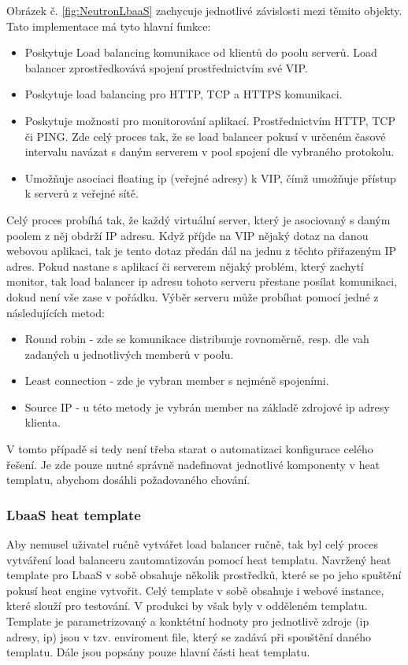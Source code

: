 Obrázek č. \ref{fig:NeutronLbaaS} zachycuje jednotlivé závislosti mezi těmito objekty. Tato implementace má tyto hlavní funkce:

\begin{itemize}
\item Poskytuje Load balancing komunikace od klientů do poolu serverů. Load balancer zprostředkovává spojení prostřednictvím své VIP.
\item Poskytuje load balancing pro HTTP, TCP a HTTPS komunikaci.
\item Poskytuje možnosti pro monitorování aplikací. Prostřednictvím HTTP, TCP či PING. Zde celý proces tak, že se load balancer pokusí v určeném časové intervalu navázat s daným serverem v pool spojení dle vybraného protokolu.
\item Umožňuje asociaci floating ip (veřejné adresy) k VIP, čímž umožňuje přístup k serverů z veřejné sítě.
\end{itemize}

Celý proces probíhá tak, že každý virtuální server, který je asociovaný s daným poolem z něj obdrží IP adresu. Když příjde na VIP nějaký dotaz na danou webovou aplikaci, tak je tento dotaz předán dál na jednu z těchto přiřazeným IP adres. Pokud nastane s aplikací či serverem nějaký problém, který zachytí monitor, tak load balancer ip adresu tohoto serveru přestane posílat komunikaci, dokud není vše zase v pořádku. Výběr serveru může probíhat pomocí jedné z následujících metod:

\begin{itemize}
\item Round robin - zde se komunikace distribuuje rovnoměrně, resp. dle vah zadaných u jednotlivých memberů v poolu.
\item Least connection - zde je vybran member s nejméně spojeními.
\item Source IP - u této metody je vybrán member na základě zdrojové ip adresy klienta.
\end{itemize}

V tomto případě si tedy není třeba starat o automatizaci konfigurace celého řešení. Je zde pouze nutné správně nadefinovat jednotlivé komponenty v heat templatu, abychom dosáhli požadovaného chování.

\subsubsection{LbaaS heat template}

Aby nemusel uživatel ručně vytvářet load balancer ručně, tak byl celý proces vytváření load balanceru zautomatizován pomocí heat templatu. Navržený heat template pro LbaaS v sobě obsahuje několik  prostředků, které se po jeho spuštění pokusí heat engine vytvořit. Celý template v sobě obsahuje i webové instance, které slouží pro testování. V produkci by však byly v odděleném templatu. Template je parametrizovaný a konktétní hodnoty pro jednotlivě zdroje (ip adresy, ip) jsou v tzv. enviroment file, který se zadává při spouštění daného templatu. Dále jsou popsány pouze hlavní části heat templatu.

